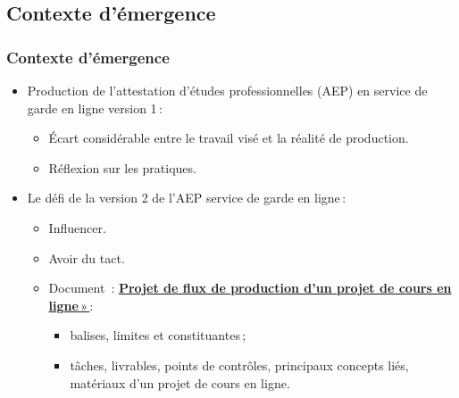                \subsection{Contexte d'émergence} 
		\begin{frame}[allowframebreaks]
			\frametitle{Contexte d'émergence}
			\begin{itemize}
				\item Production de l'attestation d'études professionnelles (AEP) en service de garde en ligne version 1\,:
                                  \begin{itemize}
                                     	\item Écart considérable entre le travail visé et la réalité de production.
                                    	\item Réflexion sur les pratiques.
                                    \end{itemize}
                                \framebreak
                                \item Le défi de la version 2 de l'AEP service de garde en ligne\,: 
                                  \begin{itemize}
                                  \item Influencer.
                                  \item Avoir du tact.
                                  \item Document \,:            \href{https://www.dropbox.com/s/0w40tx1gs61o4qn/projet\%20de\%20flux\%20de\%20production\%20d\%E2\%80\%99un\%20projet\%20de\%20cours\%20en\%20ligne\%20v0.5.doc?dl=0}{\textbf{Projet de flux de production d’un projet de cours en ligne}\,»\,}:
                                    \begin{itemize}
                                      \item balises, limites et constituantes\,;
                                      \item tâches, livrables, points de contrôles, principaux concepts liés, matériaux d’un projet de cours en ligne.
                                         
                                    \end{itemize} 
                                  \end{itemize}                                             
                                \end{itemize} 
                        \end{frame}

